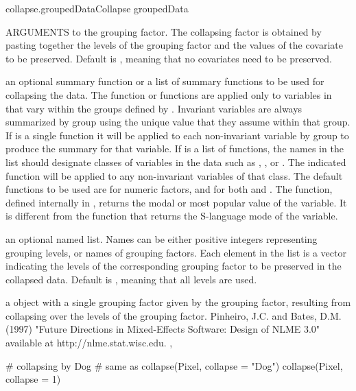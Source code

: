 \documentclass[pdftex]{article} \usepackage{url,graphicx}
\begin{document}
\begin{Helpfile}{collapse.groupedData}{Collapse groupedData}
\begin{Argument}{ARGUMENTS}
to the  grouping factor. The collapsing factor is
obtained by pasting together the levels of the 
grouping factor and the values of the covariate to be
preserved. Default is , meaning that no covariates need to
be preserved.
\item[\Co{FUN:}]
an optional summary function or a list of summary functions
to be used for collapsing the data.  The function or functions are
applied only to variables in  that vary within the
groups defined by .  Invariant variables are 
always summarized by group using the unique value that they assume
within that group.  If  is a single
function it will be applied to each non-invariant variable by group
to produce the summary for that variable.  If  is a list of
functions, the names in the list should designate classes of
variables in the data such as , , or
.  The indicated function will be applied to any
non-invariant variables of that class.  The default functions to be
used are  for numeric factors, and  for both
 and .  The  function, defined
internally in , returns the modal or most popular
value of the variable.  It is different from the  function
that returns the S-language mode of the variable.
\item[\Co{subset:}]
an optional named list. Names can be either positive
integers representing grouping levels, or names of grouping
factors. Each element in the list is a vector indicating the levels
of the corresponding grouping factor to be preserved in the collapsed
data. Default is , meaning that all levels are
used.
\end{Argument}
a  object with a single grouping factor given by the
 grouping factor, resulting from collapsing
 over the levels of the  grouping
factor.
Pinheiro, J.C. and Bates, D.M. (1997) "Future Directions in
Mixed-Effects Software: Design of NLME 3.0" available at
http://nlme.stat.wisc.edu.
, 
\need 15pt
\vspace{-16pt} 
\begin{Example}
# collapsing by Dog
# same as collapse(Pixel, collapse = "Dog")
collapse(Pixel, collapse = 1)  
\end{Example}
\end{Helpfile}
\end{document}
